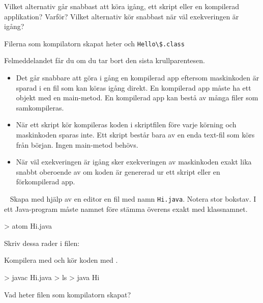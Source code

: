 \Subtask Vilket alternativ går snabbast att köra igång, ett skript eller en kompilerad applikation? Varför? Vilket alternativ kör snabbast när väl exekveringen är igång?


\SOLUTION


\TaskSolved \what


\SubtaskSolved  Filerna som kompilatorn skapat heter  och \verb+Hello\$.class+

\SubtaskSolved  Felmeddelandet får du om du tar bort den sista krullparentesen.

\SubtaskSolved

\begin{itemize}
  \item  Det går snabbare att göra i gång en kompilerad app eftersom maskinkoden är sparad i en fil som kan köras igång direkt. En kompilerad app måste ha ett objekt med en main-metod. En kompilerad app kan bestå av många filer som samkompileras.
  \item När ett skript kör kompileras koden i skriptfilen före varje körning och maskinkoden sparas inte. Ett skript består bara av en enda text-fil som körs från början. Ingen main-metod behövs.
  \item  När väl exekveringen är igång sker exekveringen av maskinkoden exakt lika snabbt oberoende av om koden är genererad ur ett skript eller en förkompilerad app.
\end{itemize}

\QUESTEND








\QUESTBEGIN

\Task \label{task:java} \what~   Skapa med hjälp av en editor en fil med namn \texttt{Hi.java}. Notera stor bokstav. I ett Java-program måste namnet före  stämma överens exakt med klassnamnet.
\begin{REPLnonum}
> atom Hi.java
\end{REPLnonum}
Skriv dessa rader i filen:


\noindent Kompilera med  och kör koden med .
\begin{REPLnonum}
> javac Hi.java
> ls
> java Hi
\end{REPLnonum}

\Subtask Vad heter filen som kompilatorn skapat?

